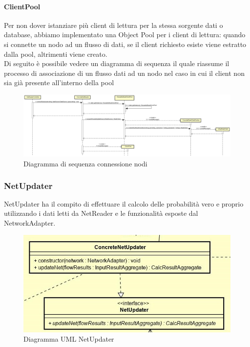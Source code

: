 \paragraph{ClientPool}\Spazio
Per non dover istanziare più client di lettura per la stessa sorgente dati o database, abbiamo implementato una Object Pool per i client di lettura: quando si connette un nodo ad un flusso di dati, se il client richiesto esiste viene estratto dalla pool, altrimenti viene creato.\\
Di seguito è possibile vedere un diagramma di sequenza il quale riassume il processo di associazione di un flusso dati ad un nodo nel caso in cui il client non sia già presente all'interno della pool
\begin{figure} [H]
	\centering
	\includegraphics[scale=0.17]{Img/ConnessioneNodi}
	\caption{Diagramma di sequenza connessione nodi}\label{}
\end{figure}
\subsubsection{NetUpdater}
NetUpdater ha il compito di effettuare il calcolo delle probabilità vero e proprio utilizzando i dati letti da NetReader e le funzionalità esposte dal NetworkAdapter.
\begin{figure} [H]
	\centering
	\includegraphics[scale=0.8]{Img/NetUpdater}
	\caption{Diagramma UML NetUpdater}\label{}
\end{figure}
